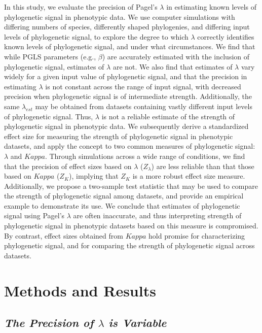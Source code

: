 \documentclass[
]{article}
\begin{document}
In this study, we evaluate the precision of Pagel's \(\lambda\) in
estimating known levels of phylogenetic signal in phenotypic data. We
use computer simulations with differing numbers of species, differently
shaped phylogenies, and differing input levels of phylogenetic signal,
to explore the degree to which \(\lambda\) correctly identifies known
levels of phylogenetic signal, and under what circumstances. We find
that while PGLS parameters (e.g., \(\beta\)) are accurately estimated
with the inclusion of phylogenetic signal, estimates of \(\lambda\) are
not. We also find that estimates of \(\lambda\) vary widely for a given
input value of phylogenetic signal, and that the precision in estimating
\(\lambda\) is not constant across the range of input signal, with
decreased precision when phylogenetic signal is of intermediate
strength. Additionally, the same \(\lambda_{est}\) may be obtained from
datasets containing vastly different input levels of phylogenetic
signal. Thus, \(\lambda\) is not a reliable estimate of the strength of
phylogenetic signal in phenotypic data. We subsequently derive a
standardized effect size for measuring the strength of phylogenetic
signal in phenotypic datasets, and apply the concept to two common
measures of phylogenetic signal: \(\lambda\) and \(Kappa\). Through
simulations across a wide range of conditions, we find that the
precision of effect sizes based on \(\lambda\) (\(Z_{\lambda}\)) are
less reliable than that those based on \(Kappa\) (\(Z_K\)), implying
that \(Z_K\) is a more robust effect size measure. Additionally, we
propose a two-sample test statistic that may be used to compare the
strength of phylogenetic signal among datasets, and provide an empirical
example to demonstrate its use. We conclude that estimates of
phylogenetic signal using Pagel's \(\lambda\) are often inaccurate, and
thus interpreting strength of phylogenetic signal in phenotypic datasets
based on this measure is compromised. By contrast, effect sizes obtained
from \(Kappa\) hold promise for characterizing phylogenetic signal, and
for comparing the strength of phylogenetic signal across datasets.

\hypertarget{methods-and-results}{%
\section{Methods and Results}\label{methods-and-results}}

\hypertarget{the-precision-of-lambda-is-variable}{%
\subsection{\texorpdfstring{\emph{The Precision of \(\lambda\) is
Variable}}{The Precision of \textbackslash lambda is Variable}}\label{the-precision-of-lambda-is-variable}}
\end{document}
